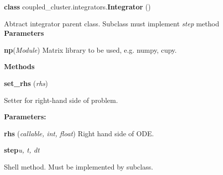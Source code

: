\begin{tcolorbox}
    {\selectfont
    \textbf{class} coupled\_cluster.integrators.\textbf{Integrator}
    ()

    \vspace{1em}
    Abtract integrator parent class. Subclass must implement \emph{step} method       
    \vspace{1em}
    \textbf{Parameters}

    \hspace{2em}\textbf{np}(\emph{Module})
        Matrix library to be used, e.g. numpy, cupy.

    \vspace{1em} 
    \textbf{Methods}

    \hspace{2em} \textbf{set\_rhs} (\emph{rhs})

        \begin{adjustwidth}{4em}{}
        Setter for right-hand side of problem.

        \textbf{Parameters:} 

            \hspace{1.5em}\textbf{rhs} (\emph{callable, int, float}) 
                Right hand side of ODE.

        \end{adjustwidth}

    \hspace{2em} \textbf{step}{\emph{u, t, dt}}

        \begin{adjustwidth}{4em}{}
            Shell method. Must be implemented by subclass.
        \end{adjustwidth}

    } 
\end{tcolorbox}